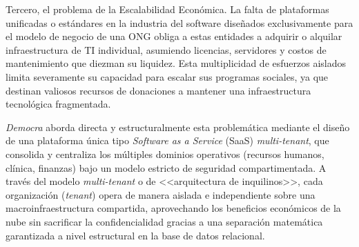 Tercero, el problema de la Escalabilidad Económica. La falta de plataformas unificadas o estándares en la industria del software diseñados exclusivamente para el modelo de negocio de una ONG obliga a estas entidades a adquirir o alquilar infraestructura de TI individual, asumiendo licencias, servidores y costos de mantenimiento que diezman su liquidez. Esta multiplicidad de esfuerzos aislados limita severamente su capacidad para escalar sus programas sociales, ya que destinan valiosos recursos de donaciones a mantener una infraestructura tecnológica fragmentada.

\textit{Democra} aborda directa y estructuralmente esta problemática mediante el diseño de una plataforma única tipo \textit{Software as a Service} (SaaS) \textit{multi-tenant}, que consolida y centraliza los múltiples dominios operativos (recursos humanos, clínica, finanzas) bajo un modelo estricto de seguridad compartimentada. A través del modelo \textit{multi-tenant} o de <<arquitectura de inquilinos>>, cada organización (\textit{tenant}) opera de manera aislada e independiente sobre una macroinfraestructura compartida, aprovechando los beneficios económicos de la nube sin sacrificar la confidencialidad gracias a una separación matemática garantizada a nivel estructural en la base de datos relacional.
